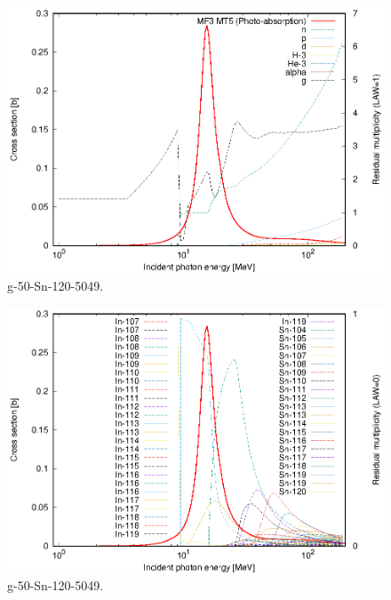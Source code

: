 \begin{figure}
 \includegraphics[width=\linewidth]{eps/g_50-Sn-120_5049.eps}
  \caption{g-50-Sn-120-5049.}
\end{figure}
\begin{figure}
 \includegraphics[width=\linewidth]{eps-law0/g_50-Sn-120_5049.eps}
 \caption{g-50-Sn-120-5049.}
\end{figure}
\newpage \clearpage

